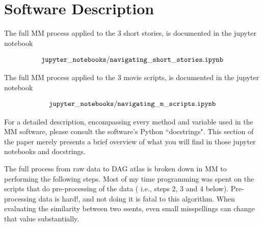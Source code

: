 \documentclass[12pt]{article}
\begin{document}
 

\section{Software Description}

The full MM process applied to the 3 short stories,
is documented in the jupyter notebook

$$\tt jupyter\_notebooks/navigating\_short\_stories.ipynb$$

The full MM process applied to the 3 movie scripts,
is documented in the jupyter notebook

$$\tt jupyter\_notebooks/navigating\_m\_scripts.ipynb$$

For a detailed description, encompassing 
every method and variable used in the
MM software,
please consult the software's Python ``docstrings".
This section of the paper merely
presents a brief overview of what you
will find in those jupyter notebooks and docstrings.

The full process from raw data to DAG atlas
is broken down in MM to
performing the following steps. 
Most of my time programming
was spent on the scripts that do
pre-processing of the data (
i.e., steps 2, 3 and 4 below).
Pre-processing data is hard!,
and not doing it is fatal
to this algorithm. When 
evaluating the similarity between
two ssents,
even small misspellings can 
change that value substantially.
 
\end{document}
